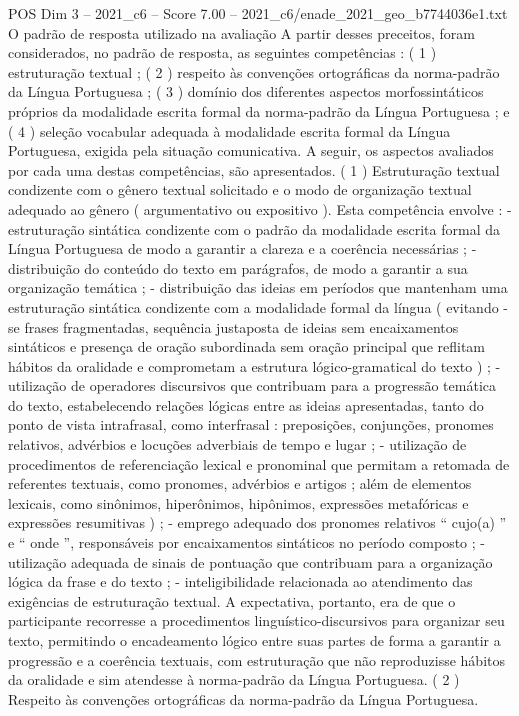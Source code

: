 \begin{textsample}{POS Dim 3 – 2021\_c6 – Score 7.00 – 2021\_c6/enade\_2021\_geo\_b7744036e1.txt}
O padrão de resposta utilizado na avaliação A partir desses preceitos, foram considerados, no padrão de resposta, as seguintes competências : ( 1 ) estruturação textual ; ( 2 ) respeito às convenções ortográficas da norma-padrão da Língua Portuguesa ; ( 3 ) domínio dos diferentes aspectos morfossintáticos próprios da modalidade escrita formal da norma-padrão da Língua Portuguesa ; e ( 4 ) seleção vocabular adequada à modalidade escrita formal da Língua Portuguesa, exigida pela situação comunicativa.
A seguir, os aspectos avaliados por cada uma destas competências, são apresentados. ( 1 ) Estruturação textual condizente com o gênero textual solicitado e o modo de organização textual adequado ao gênero ( argumentativo ou expositivo ).
Esta competência envolve : - estruturação sintática condizente com o padrão da modalidade escrita formal da Língua Portuguesa de modo a garantir a clareza e a coerência necessárias ; - distribuição do conteúdo do texto em parágrafos, de modo a garantir a sua organização temática ; - distribuição das ideias em períodos que mantenham uma estruturação sintática condizente com a modalidade formal da língua ( evitando -se frases fragmentadas, sequência justaposta de ideias sem encaixamentos sintáticos e presença de oração subordinada sem oração principal que reflitam hábitos da oralidade e comprometam a estrutura lógico-gramatical do texto ) ; - utilização de operadores discursivos que contribuam para a progressão temática do texto, estabelecendo relações lógicas entre as ideias apresentadas, tanto do ponto de vista intrafrasal, como interfrasal : preposições, conjunções, pronomes relativos, advérbios e locuções adverbiais de tempo e lugar ; - utilização de procedimentos de referenciação lexical e pronominal que permitam a retomada de referentes textuais, como pronomes, advérbios e artigos ; além de elementos lexicais, como sinônimos, hiperônimos, hipônimos, expressões metafóricas e expressões resumitivas ) ; - emprego adequado dos pronomes relativos “ cujo(a) ” e “ onde ”, responsáveis por encaixamentos sintáticos no período composto ; - utilização adequada de sinais de pontuação que contribuam para a organização lógica da frase e do texto ; - inteligibilidade relacionada ao atendimento das exigências de estruturação textual.
A expectativa, portanto, era de que o participante recorresse a procedimentos linguístico-discursivos para organizar seu texto, permitindo o encadeamento lógico entre suas partes de forma a garantir a progressão e a coerência textuais, com estruturação que não reproduzisse hábitos da oralidade e sim atendesse à norma-padrão da Língua Portuguesa. ( 2 ) Respeito às convenções ortográficas da norma-padrão da Língua Portuguesa.

\end{textsample}
